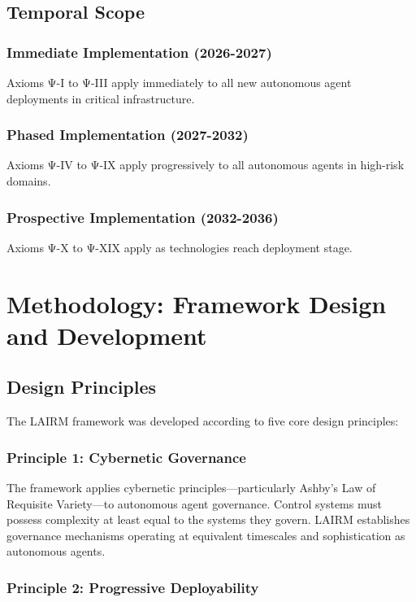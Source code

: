 \documentclass[12pt,a4paper,twoside,openright]{book}
\begin{document}
\section{Temporal Scope}

\subsection{Immediate Implementation (2026-2027)}

Axioms Ψ-I to Ψ-III apply immediately to all new autonomous agent deployments in critical infrastructure.

\subsection{Phased Implementation (2027-2032)}

Axioms Ψ-IV to Ψ-IX apply progressively to all autonomous agents in high-risk domains.

\subsection{Prospective Implementation (2032-2036)}

Axioms Ψ-X to Ψ-XIX apply as technologies reach deployment stage.

\chapter{Methodology: Framework Design and Development}
\label{ch:methodology}

\section{Design Principles}

The LAIRM framework was developed according to five core design principles:

\subsection{Principle 1: Cybernetic Governance}

The framework applies cybernetic principles—particularly Ashby's Law of Requisite Variety—to autonomous agent governance. Control systems must possess complexity at least equal to the systems they govern. LAIRM establishes governance mechanisms operating at equivalent timescales and sophistication as autonomous agents.

\subsection{Principle 2: Progressive Deployability}
\end{document}
